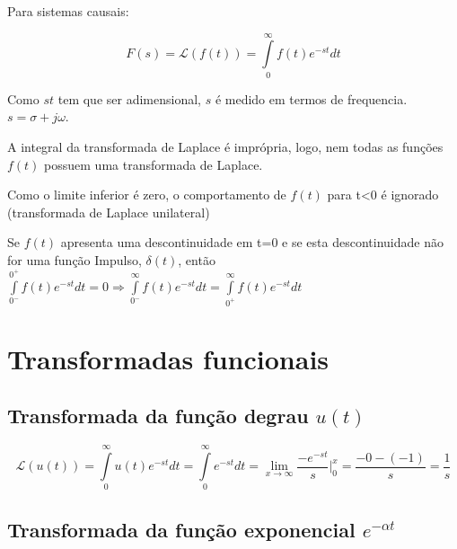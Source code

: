 \documentclass[12pt,fleqn]{book} %
\begin{document}
Para sistemas causais:

\begin{equation}\label{Laplace}
F(s) = \mathscr{L}(f(t)) = \int\limits_{0}^{\infty}f(t)e^{-st}dt
\end{equation}

\begin{remark}
Como $st$ tem que ser adimensional, $s$ é medido em termos de frequencia. $s = \sigma + j\omega$.
\end{remark}

\begin{remark}
A integral da transformada de Laplace é imprópria, logo, nem todas as funções $f(t)$ possuem uma transformada de Laplace.
\end{remark}

\begin{remark}
Como o limite inferior é zero, o comportamento de $f(t)$ para t<0 é ignorado (transformada de Laplace unilateral)
\end{remark}

\begin{remark}
Se $f(t)$ apresenta uma descontinuidade em t=0 e se esta descontinuidade não for uma função Impulso, $\delta(t)$, então $\int\limits_{0^-}^{0^+}f(t)e^{-st}dt = 0 \Rightarrow \int\limits_{0^-}^{\infty}f(t)e^{-st}dt = \int\limits_{0^+}^{\infty}f(t)e^{-st}dt$
\end{remark}

    \section{Transformadas funcionais}
    
    \subsection{Transformada da função degrau $u(t)$}
    
    \begin{equation}
    \mathscr{L}(u(t)) = \int\limits_{0}^{\infty}u(t)e^{-st}dt = \int\limits_{0}^{\infty}e^{-st}dt = \lim_{x\rightarrow\infty}\frac{-e^{-st}}{s}\Biggr|_0^x = \frac{-0-(-1)}{s} = \frac{1}{s}
    \end{equation}
    
    \subsection{Transformada da função exponencial $e^{-\alpha t}$}
    
\end{document}
